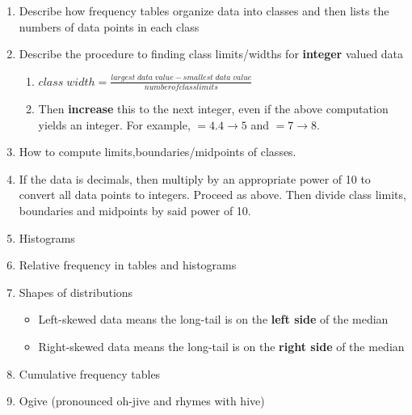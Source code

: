 \documentclass{article}
\begin{document}
\begin{enumerate}

    \item Describe how frequency tables organize data into classes and then lists the numbers of data points in each class
    
    \item Describe the procedure to finding class limits/widths for {\bf integer} valued data
    
        \begin{enumerate}
        
            \item $\displaystyle{class\;width = \frac{largest\;data\;value - smallest\;data\;value}{number of class limits}}$
            
            \item Then {\bf increase} this to the next integer, even if the above computation yields an integer. For example, $=4.4\rightarrow 5$ and $=7 \rightarrow 8$.
            
        \end{enumerate}
        
    \item How to compute limits,boundaries/midpoints of classes.
    
    \item If the data is decimals, then multiply by an appropriate power of 10 to convert all data points to integers. Proceed as above. Then divide class limits, boundaries and midpoints by said power of 10.
    
    \item Histograms
    
    \item Relative frequency in tables and histograms
    
    \item Shapes of distributions
    
        \begin{itemize}
        
            \item Left-skewed data means the long-tail is on the {\bf left side} of the median
            
            \item Right-skewed data means the long-tail is on the {\bf right side} of the median
            
        \end{itemize}
    
    \item Cumulative frequency tables
    
    \item Ogive (pronounced oh-jive and rhymes with hive)
    
\end{enumerate}
\end{document}
